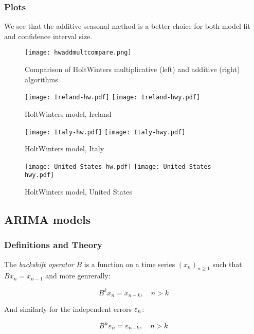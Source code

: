 \subsubsection{Plots}

We see that the additive seasonal method is a better choice for both model fit and confidence interval size.

\begin{figure}[H]
\begin{center}
\texttt{[image: hwaddmultcompare.png]}
\endminipage
\caption{Comparison of HoltWinters multiplicative (left) and additive (right) algorithms}
\end{center}
\end{figure}

\begin{figure}[H]
  \texttt{[image: Ireland-hw.pdf]} \label{fig:ireland-hw}
\endminipage\hfill
{}
  \texttt{[image: Ireland-hwy.pdf]} \label{fig:ireland-hwy}
\endminipage
\caption{HoltWinters model, Ireland}
\end{figure}

\begin{figure}[H]
  \texttt{[image: Italy-hw.pdf]} \label{fig:italy-hw}
\endminipage\hfill
{}
  \texttt{[image: Italy-hwy.pdf]} \label{fig:italy-hwy}
\endminipage
\caption{HoltWinters model, Italy}
\end{figure}

\begin{figure}[H]
  \texttt{[image: United States-hw.pdf]} \label{fig:usa-hw}
\endminipage\hfill
{}
  \texttt{[image: United States-hwy.pdf]} \label{fig:usa-hwy}
\endminipage
\caption{HoltWinters model, United States}
\end{figure}

\subsection{ARIMA models}

\subsubsection{Definitions and Theory}

\begin{definition}
The \textit{backshift operator} $B$ is a function on a time series $\left(x_n\right)_{n\geq1}$ such that $Bx_n=x_{n-1}$ and more genrerally:

$$B^k x_n= x_{n-k},\quad n>k$$

And similarly for the independent errors $\varepsilon_n$:

$$B^k \varepsilon_n= \varepsilon_{n-k},\quad n>k$$
\end{definition}

